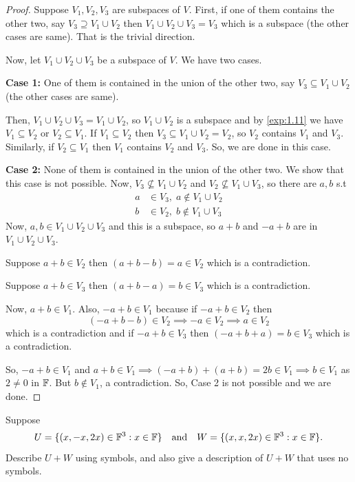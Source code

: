 \begin{proof}
Suppose $V_1, V_2, V_3$ are subspaces of $V$. First, if one of them contains the other two, say $V_3 \supseteq V_1 \cup V_2$ then $V_1 \cup V_2 \cup V_3 = V_3$ which is a subspace (the other cases are same). That is the trivial direction.

Now, let $V_1 \cup V_2 \cup V_3$ be a subspace of $V$. We have two cases.

\textbf{Case 1:} One of them is contained in the union of the other two, say $V_3 \subseteq V_1 \cup V_2$ (the other cases are same).

Then, $V_1 \cup V_2 \cup V_3 = V_1 \cup V_2$, so $V_1 \cup V_2$ is a subspace and by \ref{exp:1.11} we have $V_1 \subseteq V_2$ or $V_2 \subseteq V_1$. If $V_1 \subseteq V_2$ then $V_3 \subseteq V_1 \cup V_2 = V_2$, so $V_2$ contains $V_1$ and $V_3$. Similarly, if $V_2 \subseteq V_1$ then $V_1$ contains $V_2$ and $V_3$. So, we are done in this case.

\textbf{Case 2:} None of them is contained in the union of the other two. We show that this case is not possible. Now, $V_3 \not\subseteq V_1 \cup V_2$ and $V_2 \not\subseteq V_1 \cup V_3$, so there are $a, b$ s.t
\begin{align*}
a &\in V_3, \; a \notin V_1 \cup V_2 \\
b &\in V_2, \; b \notin V_1 \cup V_3
\end{align*}
Now, $a, b \in V_1 \cup V_2 \cup V_3$ and this is a subspace, so $a+b$ and $-a+b$ are in $V_1 \cup V_2 \cup V_3$.

Suppose $a+b \in V_2$ then $(a+b-b) = a \in V_2$ which is a contradiction.

Suppose $a+b \in V_3$ then $(a+b-a) = b \in V_3$ which is a contradiction.

Now, $a+b \in V_1$. Also, $-a+b \in V_1$ because if $-a+b \in V_2$ then
\[
(-a+b-b) \in V_2 \implies -a \in V_2 \implies a \in V_2
\]
which is a contradiction and if $-a+b \in V_3$ then $(-a+b+a) = b \in V_3$ which is a contradiction.

So, $-a+b \in V_1$ and $a+b \in V_1 \implies (-a+b)+(a+b) = 2b \in V_1 \implies b \in V_1$ as $2 \neq 0$ in $\mathbb{F}$. But $b \notin V_1$, a contradiction. So, Case 2 is not possible and we are done.
\end{proof}

\begin{exercise}
Suppose
\[
U = \{(x, -x, 2x) \in \mathbb{F}^3 : x \in \mathbb{F}\} \quad \text{and} \quad W = \{(x, x, 2x) \in \mathbb{F}^3 : x \in \mathbb{F}\}.
\]
Describe $U + W$ using symbols, and also give a description of $U + W$ that uses no symbols.
\end{exercise}

